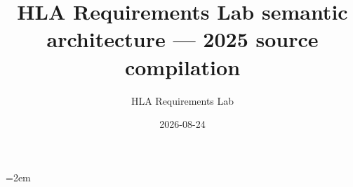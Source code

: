 \documentclass[10pt,oneside]{article}
\title{HLA Requirements Lab semantic architecture --- 2025 source compilation}
\author{HLA Requirements Lab}
\date{2026-08-24}
\begin{document}
    
    \tableofcontents
    \clearpage
    \RaggedRight
    \emergencystretch=2em
    
\end{document}
